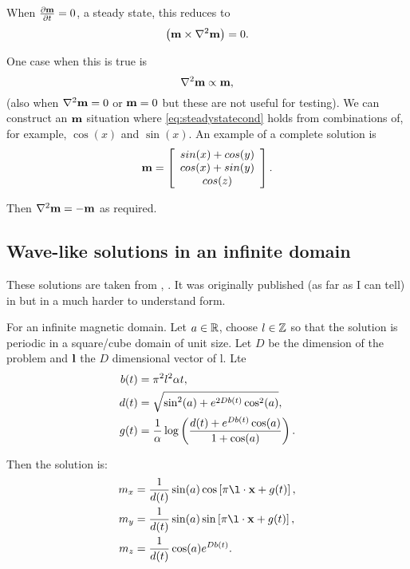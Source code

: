 When $\frac{\partial \mathbf{m}}{\partial t} = 0$, \ie a steady state, this reduces to
\begin{equation}
   \left( \mathbf{m} \times \nabla^2 \mathbf{m} \right) = 0.
\end{equation}

One case when this is true is
\begin{equation}
  \nabla^2 \mathbf{m} \propto \mathbf{m},
  \label{eq:steadystatecond}
\end{equation}
(also when $\nabla^2 \mathbf{m} = 0$ or $\mathbf{m} = 0$ but these are not useful for testing).
We can construct an $\mathbf{m}$ situation where \eqref{eq:steadystatecond} holds from combinations of, for example, $\cos(x)$ and $\sin(x)$.
An example of a complete solution is
\begin{equation}
  \mathbf{m} = \left[
    \begin{array}{c}
      sin(x) + cos(y) \\ cos(x) + sin(y) \\ cos(z)
    \end{array}
    \right].
\end{equation}

Then $\nabla^2 \mathbf{m} = - \mathbf{m}$ as required.

\subsection{Wave-like solutions in an infinite domain}

These solutions are taken from \cite{Jeong2014}, \cite{Fuwa2006}. It was originally published (as far as I can tell) in \cite{Lakshmanan1976} but in a much harder to understand form.

For an infinite magnetic domain. Let $a \in \mathbb{R}$, choose $l \in \mathbb{Z}$ so that the solution is periodic in a square/cube domain of unit size. Let $D$ be the dimension of the problem and $\mathbf{l}$ the $D$ dimensional vector of l. Lte
\begin{equation}
  \begin{aligned}
    b(t) &= \pi^2 l^2 \alpha t, \\
    d(t) &= \sqrt{\sin^2(a) + e^{2 D b(t)} \cos^2(a)}, \\
    g(t) &= \frac{1}{\alpha} \log \left( \frac{d(t) + e^{D b(t)} \cos(a)}{1 + \cos(a)} \right).
  \end{aligned}
\end{equation}

Then the solution is:
\begin{equation}
  \begin{aligned}
    m_x &= \frac{1}{d(t)} \sin(a) \cos\left[\pi \l \cdot \xv + g(t) \right], \\
    m_y &= \frac{1}{d(t)} \sin(a) \sin\left[\pi \l \cdot \xv + g(t) \right], \\
    m_z &= \frac{1}{d(t)} \cos(a) e^{D b(t)}.
  \end{aligned}
\end{equation}


